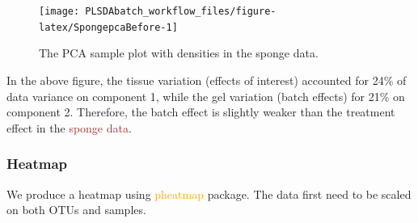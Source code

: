 \documentclass[
]{book}
\newenvironment{Shaded}{\begin{snugshade}}{\end{snugshade}}
\newcommand{\AttributeTok}[1]{\textcolor[rgb]{0.77,0.63,0.00}{#1}}
\newcommand{\ConstantTok}[1]{\textcolor[rgb]{0.00,0.00,0.00}{#1}}
\newcommand{\DecValTok}[1]{\textcolor[rgb]{0.00,0.00,0.81}{#1}}
\newcommand{\FunctionTok}[1]{\textcolor[rgb]{0.00,0.00,0.00}{#1}}
\newcommand{\NormalTok}[1]{#1}
\newcommand{\OtherTok}[1]{\textcolor[rgb]{0.56,0.35,0.01}{#1}}
\newcommand{\SpecialCharTok}[1]{\textcolor[rgb]{0.00,0.00,0.00}{#1}}
\newcommand{\StringTok}[1]{\textcolor[rgb]{0.31,0.60,0.02}{#1}}
\begin{document}
\begin{Shaded}
\end{Shaded}

\begin{figure}

{\centering \texttt{[image: PLSDAbatch\_workflow\_files/figure-latex/SpongepcaBefore-1]} 

}

\caption{The PCA sample plot with densities in the sponge data.}\label{fig:SpongepcaBefore}
\end{figure}

In the above figure, the tissue variation (effects of interest) accounted for 24\% of data variance on component 1, while the gel variation (batch effects) for 21\% on component 2. Therefore, the batch effect is slightly weaker than the treatment effect in the \textcolor{brown}{sponge data}.

\hypertarget{heatmap-1}{%
\subsubsection{Heatmap}\label{heatmap-1}}

We produce a heatmap using \textcolor{orange}{pheatmap} package. The data first need to be scaled on both OTUs and samples.
\end{document}
